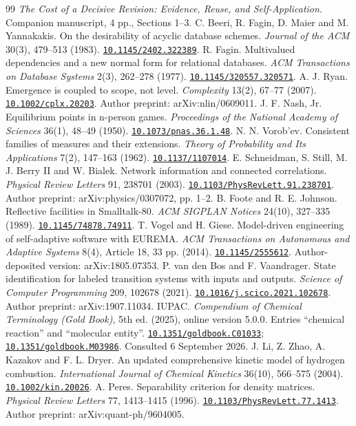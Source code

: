 \documentclass[11pt]{article}
\newcommand{\doi}[1]{\href{https://doi.org/#1}{\nolinkurl{#1}}}
\begin{document}
\begin{thebibliography}{99}
\small
{} \emph{The Cost of a Decisive Revision: Evidence, Reuse, and Self-Application}. Companion manuscript, 4 pp., Sections 1--3.
 C. Beeri, R. Fagin, D. Maier and M. Yannakakis. On the desirability of acyclic database schemes. \emph{Journal of the ACM} 30(3), 479--513 (1983). \doi{10.1145/2402.322389}.
 R. Fagin. Multivalued dependencies and a new normal form for relational databases. \emph{ACM Transactions on Database Systems} 2(3), 262--278 (1977). \doi{10.1145/320557.320571}.
 A. J. Ryan. Emergence is coupled to scope, not level. \emph{Complexity} 13(2), 67--77 (2007). \doi{10.1002/cplx.20203}. Author preprint: arXiv:nlin/0609011.
 J. F. Nash, Jr. Equilibrium points in n-person games. \emph{Proceedings of the National Academy of Sciences} 36(1), 48--49 (1950). \doi{10.1073/pnas.36.1.48}.
 N. N. Vorob'ev. Consistent families of measures and their extensions. \emph{Theory of Probability and Its Applications} 7(2), 147--163 (1962). \doi{10.1137/1107014}.
 E. Schneidman, S. Still, M. J. Berry II and W. Bialek. Network information and connected correlations. \emph{Physical Review Letters} 91, 238701 (2003). \doi{10.1103/PhysRevLett.91.238701}. Author preprint: arXiv:physics/0307072, pp. 1--2.
 B. Foote and R. E. Johnson. Reflective facilities in Smalltalk-80. \emph{ACM SIGPLAN Notices} 24(10), 327--335 (1989). \doi{10.1145/74878.74911}.
 T. Vogel and H. Giese. Model-driven engineering of self-adaptive software with EUREMA. \emph{ACM Transactions on Autonomous and Adaptive Systems} 8(4), Article 18, 33 pp. (2014). \doi{10.1145/2555612}. Author-deposited version: arXiv:1805.07353.
 P. van den Bos and F. Vaandrager. State identification for labeled transition systems with inputs and outputs. \emph{Science of Computer Programming} 209, 102678 (2021). \doi{10.1016/j.scico.2021.102678}. Author preprint: arXiv:1907.11034.
 IUPAC. \emph{Compendium of Chemical Terminology (Gold Book)}, 5th ed. (2025), online version 5.0.0. Entries ``chemical reaction'' and ``molecular entity''. \doi{10.1351/goldbook.C01033}; \doi{10.1351/goldbook.M03986}. Consulted 6 September 2026.
 J. Li, Z. Zhao, A. Kazakov and F. L. Dryer. An updated comprehensive kinetic model of hydrogen combustion. \emph{International Journal of Chemical Kinetics} 36(10), 566--575 (2004). \doi{10.1002/kin.20026}.
 A. Peres. Separability criterion for density matrices. \emph{Physical Review Letters} 77, 1413--1415 (1996). \doi{10.1103/PhysRevLett.77.1413}. Author preprint: arXiv:quant-ph/9604005.

\end{thebibliography}
\end{document}
